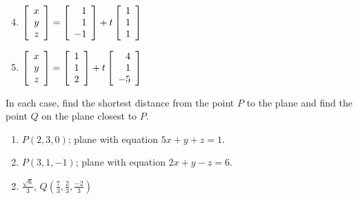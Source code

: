 \begin{multicols}{2}
\begin{ex}
\begin{sol}
\begin{enumerate}[label={\alph*.}]
\setcounter{enumi}{3}
\item 
$\left[
\begin{array}{r}
x\\
y\\
z
\end{array}
\right]
=
\left[
\begin{array}{r}
1\\
1\\
-1
\end{array}
\right]
+t
\left[
\begin{array}{r}
1\\
1\\
1
\end{array}
\right]
$

\setcounter{enumi}{5}
\item  
$\left[
\begin{array}{r}
x\\
y\\
z
\end{array}
\right]
=
\left[
\begin{array}{r}
1\\
1\\
2
\end{array}
\right]
+t
\left[
\begin{array}{r}
4\\
1\\
-5
\end{array}
\right]
$

\end{enumerate}
\end{sol}
\end{ex}

\begin{ex}
In each case, find the shortest distance from the point $P$ to the plane and find the point $Q$ on the plane closest to $P$.


\begin{enumerate}[label={\alph*.}]
\item $P(2, 3, 0)$; plane with equation $5x + y + z = 1$.

\item $P(3, 1, -1)$; plane with equation $2x + y - z = 6$.

\end{enumerate}
\begin{sol}
\begin{enumerate}[label={\alph*.}]
\setcounter{enumi}{1}
\item  $\frac{\sqrt{6}}{3}$, $Q(\frac{7}{3}, \frac{2}{3}, \frac{-2}{3})$


\end{enumerate}
\end{sol}
\end{ex}
\end{multicols}
